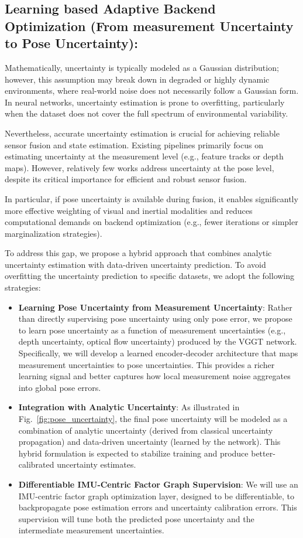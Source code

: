 \subsection{Learning based Adaptive Backend Optimization (From measurement Uncertainty to Pose Uncertainty):}

Mathematically, uncertainty is typically modeled as a Gaussian distribution; however, this assumption may break down in degraded or highly dynamic environments, where real-world noise does not necessarily follow a Gaussian form. In neural networks, uncertainty estimation is prone to overfitting, particularly when the dataset does not cover the full spectrum of environmental variability.

Nevertheless, accurate uncertainty estimation is crucial for achieving reliable sensor fusion and state estimation. Existing pipelines primarily focus on estimating uncertainty at the measurement level (e.g., feature tracks or depth maps). However, relatively few works address uncertainty at the pose level, despite its critical importance for efficient and robust sensor fusion.

In particular, if pose uncertainty is available during fusion, it enables significantly more effective weighting of visual and inertial modalities and reduces computational demands on backend optimization (e.g., fewer iterations or simpler marginalization strategies).

To address this gap, we propose a hybrid approach that combines analytic uncertainty estimation with data-driven uncertainty prediction. To avoid overfitting the uncertainty prediction to specific datasets, we adopt the following strategies:

\begin{itemize}
    \item \textbf{Learning Pose Uncertainty from Measurement Uncertainty}: Rather than directly supervising pose uncertainty using only pose error, we propose to learn pose uncertainty as a function of measurement uncertainties (e.g., depth uncertainty, optical flow uncertainty) produced by the VGGT network. Specifically, we will develop a learned encoder-decoder architecture that maps measurement uncertainties to pose uncertainties. This provides a richer learning signal and better captures how local measurement noise aggregates into global pose errors.
    \item \textbf{Integration with Analytic Uncertainty}:  As illustrated in Fig.~\ref{fig:pose_uncertainty}, the final pose uncertainty will be modeled as a combination of analytic uncertainty (derived from classical uncertainty propagation) and data-driven uncertainty (learned by the network). This hybrid formulation is expected to stabilize training and produce better-calibrated uncertainty estimates.
    \item \textbf{Differentiable IMU-Centric Factor Graph Supervision}: We will use an IMU-centric factor graph optimization layer, designed to be differentiable, to backpropagate pose estimation errors and uncertainty calibration errors. This supervision will tune both the predicted pose uncertainty and the intermediate measurement uncertainties.
\end{itemize}

